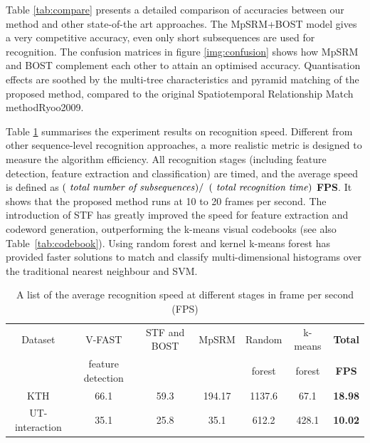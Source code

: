Table \ref{tab:compare} presents a detailed comparison of accuracies between our method and other state-of-the art approaches. The MpSRM+BOST model gives a very competitive accuracy, even only short subsequences are used for recognition. The confusion matrices in figure \ref{img:confusion} shows how MpSRM and BOST complement each other to attain an optimised accuracy. Quantisation effects are soothed by the multi-tree characteristics and pyramid matching of the proposed method, compared to the original Spatiotemporal Relationship Match method{Ryoo2009}.

Table \ref{tab:speed} summarises the experiment results on recognition speed. Different from other sequence-level recognition approaches, a more realistic metric is designed to measure the algorithm efficiency. All recognition stages (including feature detection, feature extraction and classification) are timed, and the average speed is defined as $(\mbox{\textit{ total number of subsequences}})/$ $(\mbox{\textit{ total recognition time}})$ \textbf{FPS}. It shows that the proposed method runs at 10 to 20 frames per second. The introduction of STF has greatly improved the speed for feature extraction and codeword generation, outperforming the k-means visual codebooks (see also Table~\ref{tab:codebook}). Using random forest and kernel k-means forest has provided faster solutions to match and classify multi-dimensional histograms over the traditional nearest neighbour and SVM. 
\begin{table}
\centering
{\footnotesize
\begin{tabular}{|c|c|c|c|c|c|c|}
\hline
Dataset & V-FAST  & STF and BOST & MpSRM & Random & k-means & \textbf{ Total }\\
 & feature detection &   &  & forest & forest & \textbf{ FPS}\\
\hline
KTH & 66.1 & 59.3 & 194.17 & 1137.6 & 67.1 & \textbf{ 18.98 } \\
UT-interaction & 35.1 & 25.8 & 35.1 & 612.2 & 428.1 & \textbf{ 10.02 } \\
\hline
\end{tabular}
}
\caption{A list of the average recognition speed at different stages in frame per second (FPS)}
\label{tab:speed}
\end{table}
